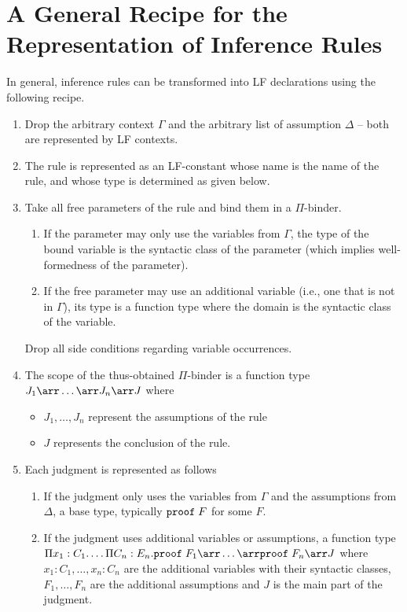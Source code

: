 \section{A General Recipe for the Representation of Inference Rules}\label{sec:recipe}

In general, inference rules can be transformed into LF declarations using the following recipe.
\begin{enumerate}
	\item Drop the arbitrary context $\Gamma$ and the arbitrary list of assumption $\Delta$ -- both are represented by LF contexts.
  \item The rule is represented as an LF-constant whose name is the name of the rule, and whose type is determined as given below.
	\item Take all free parameters of the rule and bind them in a $\Pi$-binder.
    \begin{enumerate}
	    \item If the parameter may only use the variables from $\Gamma$, the type of the bound variable is the syntactic class of the parameter (which implies well-formedness of the parameter).
	    \item If the free parameter may use an additional variable (i.e., one that is not in $\Gamma$), its type is a function type where the domain is the syntactic class of the variable.
    \end{enumerate}
    Drop all side conditions regarding variable occurrences.
  \item The scope of the thus-obtained $\Pi$-binder is a function type $J_1\arr\ldots\arr J_n\arr J$ where
     \begin{itemize}
	     \item $J_1,\ldots,J_n$ represent the assumptions of the rule
	     \item $J$ represents the conclusion of the rule.
     \end{itemize}
  \item Each judgment is represented as follows
     \begin{enumerate}
	     \item If the judgment only uses the variables from $\Gamma$ and the assumptions from $\Delta$, a base type, typically $\mathtt{proof}\;F$ for some $F$.
	     \item If the judgment uses additional variables or assumptions, a function type $\P{x_1}{C_1}\ldots\P{C_n}{E_n}\PROOF\;F_1\arr\ldots\arr\PROOF\;F_n\arr J$ where $x_1:C_1,\ldots,x_n:C_n$ are the additional variables with their syntactic classes, $F_1,\ldots,F_n$ are the additional assumptions and $J$ is the main part of the judgment.
    \end{enumerate}
\end{enumerate}

